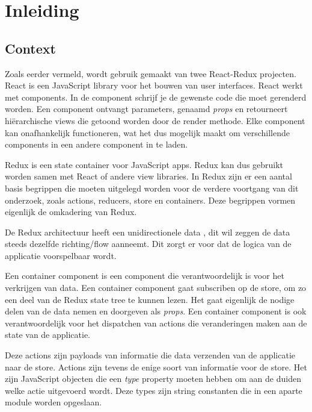 
\chapter*{Inleiding}
\label{ch:inleiding}

\section{Context}
\label{sec:context}

Zoals eerder vermeld, wordt gebruik gemaakt van twee React-Redux projecten. React is een JavaScript library voor het bouwen van user interfaces. React werkt met components. In de component schrijf je de gewenste code die moet gerenderd worden. Een component ontvangt parameters, genaamd \textit{props} en retourneert hiërarchische views die getoond worden door de render methode. Elke component kan onafhankelijk functioneren, wat het dus mogelijk maakt om verschillende components in een andere component in te laden. \autocite{React01} 

Redux is een state container voor JavaScript apps. Redux kan dus gebruikt worden samen met React of andere view libraries. 
In Redux zijn er een aantal basis begrippen die moeten uitgelegd worden voor de verdere voortgang van dit onderzoek, zoals actions, reducers, store en containers. Deze begrippen vormen eigenlijk de omkadering van Redux. \autocite{Redux02}

De Redux architectuur heeft een unidirectionele data 
, dit wil zeggen de data steeds dezelfde richting/flow aanneemt. Dit zorgt er voor dat de logica van de applicatie voorspelbaar wordt.  

Een container component is een component die verantwoordelijk is voor het verkrijgen van data. Een container component gaat subscriben op de store, om zo een deel van de Redux state tree te kunnen lezen. Het gaat eigenlijk de nodige delen van de data nemen en doorgeven als \textit{props}. Een container component is ook verantwoordelijk voor het dispatchen van actions die veranderingen maken aan de state van de applicatie. 

Deze actions zijn payloads van informatie die data verzenden van de applicatie naar de store. Actions zijn tevens de enige soort van informatie voor de store. Het zijn JavaScript objecten die een \textit{type} property moeten hebben om aan de duiden welke actie uitgevoerd wordt. Deze types zijn string constanten die in een aparte module worden opgeslaan. 

